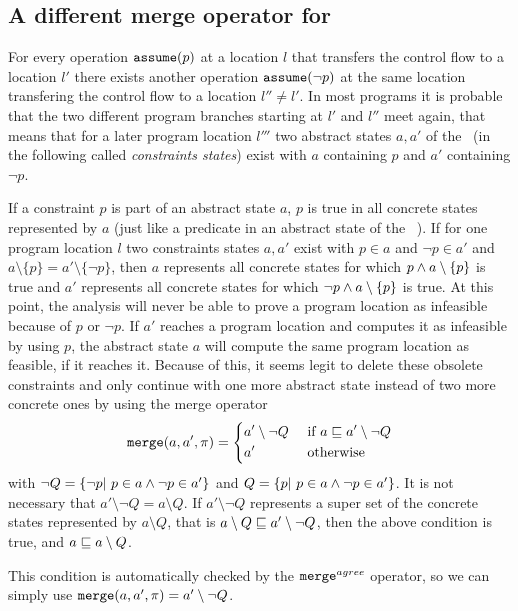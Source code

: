 \subsection{A different merge operator for \constraintsCPA}
\label{sec:newMerge}
For every operation $\texttt{assume}(p)$ at a location $l$ that transfers the control flow to a location $l'$ there exists another operation $\texttt{assume}(\neg p)$ at the same location transfering the control flow to a location $l'' \neq l'$.
In most programs it is probable that the two different program branches starting at $l'$ and $l''$ meet again, that means that for a later program location $l'''$ two abstract states $a, a'$ of the \constraintsCPA\ (in the following  called \emph{constraints states}) exist with $a$ containing $p$ and $a'$ containing $\neg p$.

If a constraint $p$ is part of an abstract state $a$, $p$ is true in all concrete states represented by $a$ (just like a predicate in an abstract state of the \predicateCPA\ \cite{Beyer2008}).
If for one program location $l$ two constraints states $a, a'$ exist with $p \in a$ and $\neg p \in a'$ and $a \setminus \{ p \} = a' \setminus \{ \neg p \}$,
then $a$ represents all concrete states for which $p \wedge a \setminus \{ p \}$ is true and $a'$ represents all concrete states for which $\neg p \wedge a \setminus \{ p \}$ is true.
At this point, the analysis will never be able to prove a program location as infeasible because of $p$ or $\neg p$.
If $a'$ reaches a program location and computes it as infeasible by using $p$, the abstract state $a$ will compute the same program location as feasible, if it reaches it.
Because of this, it seems legit to delete these obsolete constraints and only continue with one more abstract state instead of two more concrete ones by using the merge operator
\[ \texttt{merge} (a, a', \pi) = \begin{dcases}
a' \setminus \neg Q & \text{ if } a \sqsubseteq a' \setminus \neg Q \\
a' & \text{ otherwise}
\end{dcases} \]
with $\neg Q = \{\neg p |\ p \in a \wedge \neg p \in a' \}$ and $Q = \{ p |\ p \in a \wedge \neg p \in a' \}$.
It is not necessary that $a' \setminus \neg Q = a \setminus Q$.
If $a' \setminus \neg Q$ represents a super set of the concrete states represented by $a \setminus Q$, that is $a \setminus Q \sqsubseteq a' \setminus \neg Q$, then the above condition is true, and $a \sqsubseteq a \setminus Q$.

This condition is automatically checked by the ${\texttt{merge}^{agree}}$ operator, so we can simply use $\texttt{merge}(a, a', \pi) = a' \setminus \neg Q$.